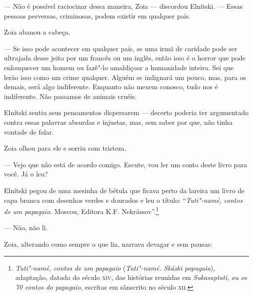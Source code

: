 --- Não é possível raciocinar dessa maneira, Zoia --- discordou
Elnítski. --- Essas pessoas perversas, criminosas, podem existir em
qualquer país.

Zoia abanou a cabeça.

--- Se isso pode acontecer em qualquer país, se uma irmã de caridade
pode ser ultrajada desse jeito por um francês ou um inglês, então isso é
o horror que pode enlouquecer um homem ou fazê"-lo amaldiçoar a
humanidade inteira. Sei que lerão isso como um crime qualquer. Alguém se
indignará um pouco, mas, para os demais, será algo indiferente. Enquanto
não mexem conosco, tudo nos é indiferente. Não passamos de animais
cruéis.

Elnítski sentiu seus pensamentos dispersarem --- decerto poderia ter
argumentado contra essas palavras absurdas e injustas, mas, sem saber
por que, não tinha vontade de falar.

Zoia olhou para ele e sorriu com tristeza.

--- Vejo que não está de acordo comigo. Escute, vou ler um conto deste
livro para você. Já o leu?

Elnítski pegou de uma mesinha de bétula que ficava perto da lareira um
livro de capa branca com desenhos verdes e dourados e leu o título:
``\emph{Tuti"-namé, contos de um papagaio.} Moscou, Editora K.F.
Nekrássov''.\footnote{\emph{Tuti"-namé, contos de um
  papagaio} (\emph{Tuti"-namé. Skázki popugaia}), adaptação, datada do
  século \textsc{xiv}, das histórias reunidas em \emph{Sukasaptati}, \emph{ou}
  \emph{os 70 contos do papagaio}, escritas em sânscrito no
  século \textsc{xii}.}

--- Não, não li.

Zoia, alterando como sempre o que lia, narrava devagar e sem pausas:

